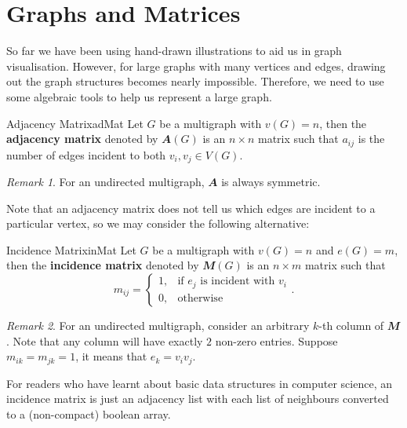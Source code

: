 \documentclass[math, code]{amznotes}
\theoremstyle{remark}
\newtheorem*{remark}{Remark}
\begin{document}
\section{Graphs and Matrices}
So far we have been using hand-drawn illustrations to aid us in graph visualisation. However, for large graphs with many vertices and edges, drawing out the graph structures becomes nearly impossible. Therefore, we need to use some algebraic tools to help us represent a large graph.
\begin{dfnbox}{Adjacency Matrix}{adMat}
    Let $G$ be a multigraph with $v(G) = n$, then the {\color{red} \textbf{adjacency matrix}} denoted by $\mathbfit{A}(G)$ is an $n \times n$ matrix such that $a_{ij}$ is the number of edges incident to both $v_i, v_j \in V(G)$.
\end{dfnbox}
\begin{notebox}
    \begin{remark}
        For an undirected multigraph, $\mathbfit{A}$ is always symmetric.
    \end{remark}
\end{notebox}
Note that an adjacency matrix does not tell us which edges are incident to a particular vertex, so we may consider the following alternative:
\begin{dfnbox}{Incidence Matrix}{inMat}
    Let $G$ be a multigraph with $v(G) = n$ and $e(G) = m$, then the {\color{red} \textbf{incidence matrix}} denoted by $\mathbfit{M}(G)$ is an $n \times m$ matrix such that
    \begin{equation*}
        m_{ij} = \begin{cases}
            1, &\textrm{if } e_j \textrm{ is incident with } v_i \\
            0, &\textrm{otherwise}
        \end{cases}.
    \end{equation*}
\end{dfnbox}
\begin{notebox}
    \begin{remark}
        For an undirected multigraph, consider an arbitrary $k$-th column of $\mathbfit{M}$. Note that any column will have exactly $2$ non-zero entries. Suppose $m_{ik} = m_{jk} = 1$, it means that $e_k = v_iv_j$.
    \end{remark}
\end{notebox}
For readers who have learnt about basic data structures in computer science, an incidence matrix is just an adjacency list with each list of neighbours converted to a (non-compact) boolean array.
\end{document}
